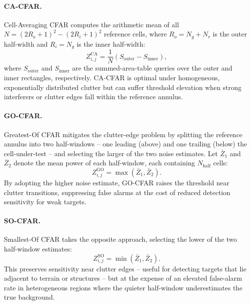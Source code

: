 \documentclass[conf]{new-aiaa}
\begin{document}
\paragraph{CA-CFAR.} Cell-Averaging CFAR computes the arithmetic mean of all $N = (2R_o+1)^2 - (2R_i+1)^2$ reference cells, where $R_o = N_g + N_r$ is the outer half-width and $R_i = N_g$ is the inner half-width:
\begin{equation}
    Z_{i,j}^{\mathrm{CA}} = \frac{1}{N}\left(S_{\mathrm{outer}} - S_{\mathrm{inner}}\right), \label{eq:ca}
\end{equation}
where $S_{\mathrm{outer}}$ and $S_{\mathrm{inner}}$ are the summed-area-table queries over the outer and inner rectangles, respectively. CA-CFAR is optimal under homogeneous, exponentially distributed clutter but can suffer threshold elevation when strong interferers or clutter edges fall within the reference annulus.

\paragraph{GO-CFAR.} Greatest-Of CFAR mitigates the clutter-edge problem by splitting the reference annulus into two half-windows -- one leading (above) and one trailing (below) the cell-under-test -- and selecting the larger of the two noise estimates. Let $\bar{Z}_1$ and $\bar{Z}_2$ denote the mean power of each half-window, each containing $N_{\mathrm{half}}$ cells:
\begin{equation}
    Z_{i,j}^{\mathrm{GO}} = \max(\bar{Z}_1, \bar{Z}_2). \label{eq:go}
\end{equation}
By adopting the higher noise estimate, GO-CFAR raises the threshold near clutter transitions, suppressing false alarms at the cost of reduced detection sensitivity for weak targets.

\paragraph{SO-CFAR.} Smallest-Of CFAR takes the opposite approach, selecting the lower of the two half-window estimates:
\begin{equation}
    Z_{i,j}^{\mathrm{SO}} = \min(\bar{Z}_1, \bar{Z}_2). \label{eq:so}
\end{equation}
This preserves sensitivity near clutter edges -- useful for detecting targets that lie adjacent to terrain or structures -- but at the expense of an elevated false-alarm rate in heterogeneous regions where the quieter half-window underestimates the true background.
\end{document}
